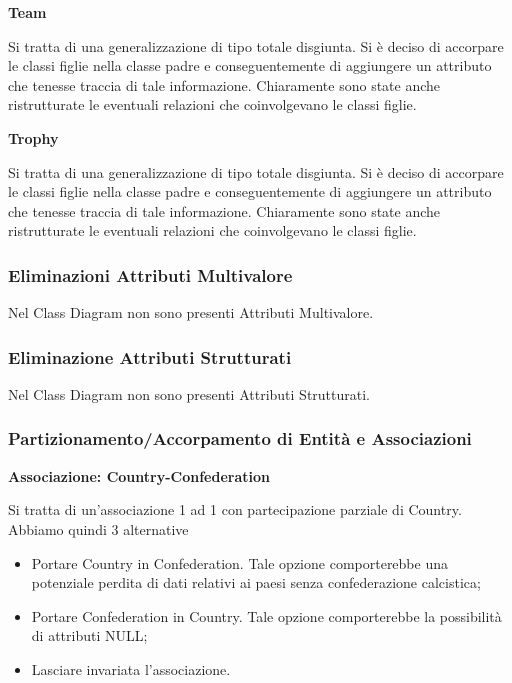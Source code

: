 \textbf{Team}

Si tratta di una generalizzazione di tipo totale disgiunta. Si è deciso di accorpare le
classi figlie nella classe padre e conseguentemente di aggiungere un attributo che tenesse traccia
di tale informazione.
Chiaramente sono state anche ristrutturate le eventuali relazioni che coinvolgevano le classi figlie.

\textbf{Trophy}

Si tratta di una generalizzazione di tipo totale disgiunta. Si è deciso di accorpare le
classi figlie nella classe padre e conseguentemente di aggiungere un attributo che tenesse traccia
di tale informazione.
Chiaramente sono state anche ristrutturate le eventuali relazioni che coinvolgevano le classi figlie.


\newpage
\subsubsection{Eliminazioni Attributi Multivalore}
\bigskip

Nel Class Diagram non sono presenti Attributi Multivalore.

\bigskip
\subsubsection{Eliminazione Attributi Strutturati}
\bigskip

Nel Class Diagram non sono presenti Attributi Strutturati.

\bigskip
\subsubsection{Partizionamento/Accorpamento di Entità e Associazioni}
\bigskip

\textbf{Associazione: Country-Confederation}

Si tratta di un'associazione 1 ad 1 con partecipazione parziale di Country.
Abbiamo quindi 3 alternative
\begin{itemize}
	\item Portare Country in Confederation. Tale opzione comporterebbe una potenziale
		perdita di dati relativi ai paesi senza confederazione calcistica;
	\item Portare Confederation in Country. Tale opzione comporterebbe la possibilità
		di attributi NULL;
	\item Lasciare invariata l'associazione.
\end{itemize}

